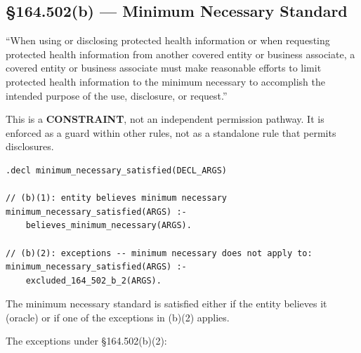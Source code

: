 \documentclass[11pt,letterpaper]{article}
\begin{document}
\subsection{\S 164.502(b) --- Minimum Necessary Standard}
\label{sec:502b}

\begin{hipaabox}
``When using or disclosing protected health information or when requesting protected health information from another covered entity or business associate, a covered entity or business associate must make reasonable efforts to limit protected health information to the minimum necessary to accomplish the intended purpose of the use, disclosure, or request.''
\end{hipaabox}

\begin{warningbox}
This is a \textbf{CONSTRAINT}, not an independent permission pathway. It is enforced as a guard within other rules, not as a standalone rule that permits disclosures.
\end{warningbox}

\begin{lstlisting}[style=soufflestyle,caption={\S 164.502(b) --- minimum necessary}]
.decl minimum_necessary_satisfied(DECL_ARGS)

// (b)(1): entity believes minimum necessary
minimum_necessary_satisfied(ARGS) :-
    believes_minimum_necessary(ARGS).

// (b)(2): exceptions -- minimum necessary does not apply to:
minimum_necessary_satisfied(ARGS) :-
    excluded_164_502_b_2(ARGS).
\end{lstlisting}

The minimum necessary standard is satisfied either if the entity believes it (oracle) or if one of the exceptions in (b)(2) applies.

The exceptions under \S 164.502(b)(2):
\end{document}
